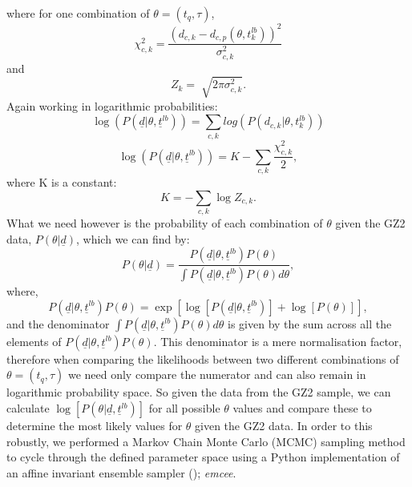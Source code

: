 \documentclass{article}[11pt]
\begin{document}
where for one combination of $\theta = (t_{q}, \tau)$,
\begin{equation*}
\chi_{c, k}^2 = \frac{(d_{c, k} - d_{c, p}(\theta, t_{k}^{lb}))^2}{\sigma_{c, k}^2}
\end{equation*}
and
\begin{equation*}
Z_{k} = \sqrt[]{2\pi\sigma_{c, k}^2}.
\end{equation*}
Again working in logarithmic probabilities:
\begin{equation*}
\log{(P(\underline{d}|\theta, \underline{t}^{lb}))} = \sum_{c, k} log(P(d_{c, k}|\theta, t_{k}^{lb}))
\end{equation*}
\begin{equation*}
\log{(P(\underline{d}|\theta,  \underline{t}^{lb}))}  = K - \sum_{c, k} \frac{\chi_{c, k}^2}{2},
\end{equation*}
where K is a constant:
\begin{equation*}
K = - \sum_{c, k} \log{Z_{c, k}}. 
\end{equation*}
What we need however is the probability of each combination of $\theta$ given the GZ2 data, $P(\theta|\underline{d})$, which we can find by:
\begin{equation*}
P(\theta|\underline{d}) = \frac{P(\underline{d}|\theta, \underline{t}^{lb})P(\theta)}{\int P(\underline{d}|\theta, \underline{t}^{lb})P(\theta) d\theta},
\end{equation*}
where,
\begin{equation*}
P(\underline{d}|\theta, \underline{t}^{lb})P(\theta) = \exp{\left[\log{[P(\underline{d}|\theta, \underline{t}^{lb})]} + \log{[P(\theta)]}\right]},
\end{equation*}
and the denominator $\int P(\underline{d}|\theta, \underline{t}^{lb})P(\theta) d\theta$ is given by the sum across all the elements of $P(\underline{d}|\theta, \underline{t}^{lb})P(\theta)$. This denominator is a mere normalisation factor, therefore when comparing the likelihoods between two different combinations of $\theta = (t_{q}, \tau)$ we need only compare the numerator and can also remain in logarithmic probability space. So given the data from the GZ2 sample, we can calculate $\log[P(\theta|\underline{d}, \underline{t}^{lb})]$ for all possible $\theta$ values and compare these to determine the most likely values for $\theta$ given the GZ2 data. In order to this robustly, we performed a Markov Chain Monte Carlo (MCMC) sampling method to cycle through the defined parameter space using a Python implementation of an affine invariant ensemble sampler (\cite{Dan}); \emph{emcee}.
\end{document}
